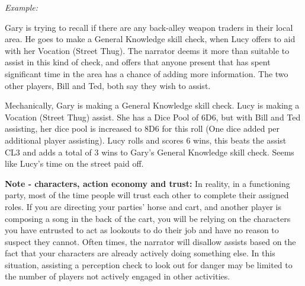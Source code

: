\textit{Example:}

\begin{displayquote}
    Gary is trying to recall if there are any back-alley weapon traders in their local area. He goes to make a General Knowledge skill check, when Lucy offers to aid with her Vocation (Street Thug). The narrator deems it more than suitable to assist in this kind of check, and offers that anyone present that has spent significant time in the area has a chance of adding more information. The two other players, Bill and Ted, both say they wish to assist.

    Mechanically, Gary is making a General Knowledge skill check. Lucy is making a Vocation (Street Thug) assist. She has a Dice Pool of 6D6, but with Bill and Ted assisting, her dice pool is increased to 8D6 for this roll (One dice added per additional player assisting). Lucy rolls and scores 6 wins, this beats the assist CL3 and adds a total of 3 wins to Gary's General Knowledge skill check. Seems like Lucy's time on the street paid off.
\end{displayquote}

\textbf{Note - characters, action economy and trust:} In reality, in a functioning party, most of the time people will trust each other to complete their assigned roles. If you are directing your parties’ horse and cart, and another player is composing a song in the back of the cart, you will be relying on the characters you have entrusted to act as lookouts to do their job and have no reason to suspect they cannot. Often times, the narrator will disallow assists based on the fact that your characters are already actively doing something else. In this situation, assisting a perception check to look out for danger may be limited to the number of players not actively engaged in other activities.
